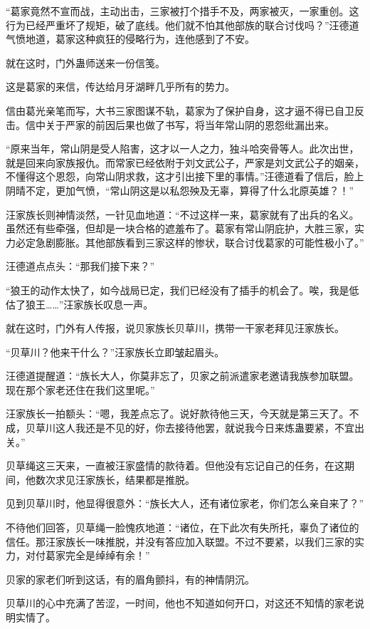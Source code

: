 \begin{this_body}
“葛家竟然不宣而战，主动出击，三家被打个措手不及，两家被灭，一家重创。这行为已经严重坏了规矩，破了底线。他们就不怕其他部族的联合讨伐吗？”汪德道气愤地道，葛家这种疯狂的侵略行为，连他感到了不安。

就在这时，门外蛊师送来一份信笺。

这是葛家的来信，传达给月牙湖畔几乎所有的势力。

信由葛光亲笔而写，大书三家图谋不轨，葛家为了保护自身，这才逼不得已自卫反击。信中关于严家的前因后果也做了书写，将当年常山阴的恩怨纰漏出来。

“原来当年，常山阴是受人陷害，这才以一人之力，独斗哈突骨等人。此次出世，就是回来向家族报仇。而常家已经依附于刘文武公子，严家是刘文武公子的姻亲，不懂得这个恩怨，向常山阴求救，这才引出接下里的事情。”汪德道看了信后，脸上阴晴不定，更加气愤，“常山阴这是以私怨殃及无辜，算得了什么北原英雄？！”

汪家族长则神情淡然，一针见血地道：“不过这样一来，葛家就有了出兵的名义。虽然还有些牵强，但却是一块合格的遮羞布了。葛家有常山阴庇护，大胜三家，实力必定急剧膨胀。其他部族看到三家这样的惨状，联合讨伐葛家的可能性极小了。”

汪德道点点头：“那我们接下来？”

“狼王的动作太快了，如今战局已定，我们已经没有了插手的机会了。唉，我是低估了狼王……”汪家族长叹息一声。

就在这时，门外有人传报，说贝家族长贝草川，携带一干家老拜见汪家族长。

“贝草川？他来干什么？”汪家族长立即皱起眉头。

汪德道提醒道：“族长大人，你莫非忘了，贝家之前派遣家老邀请我族参加联盟。现在那个家老还住在我们这里呢。”

汪家族长一拍额头：“嗯，我差点忘了。说好款待他三天，今天就是第三天了。不成，贝草川这人我还是不见的好，你去接待他罢，就说我今日来炼蛊要紧，不宜出关。”

贝草绳这三天来，一直被汪家盛情的款待着。但他没有忘记自己的任务，在这期间，他数次求见汪家族长，结果都是推脱。

见到贝草川时，他显得很意外：“族长大人，还有诸位家老，你们怎么亲自来了？”

不待他们回答，贝草绳一脸愧疚地道：“诸位，在下此次有失所托，辜负了诸位的信任。那汪家族长一味推脱，并没有答应加入联盟。不过不要紧，以我们三家的实力，对付葛家完全是绰绰有余！”

贝家的家老们听到这话，有的眉角颤抖，有的神情阴沉。

贝草川的心中充满了苦涩，一时间，他也不知道如何开口，对这还不知情的家老说明实情了。

\end{this_body}


